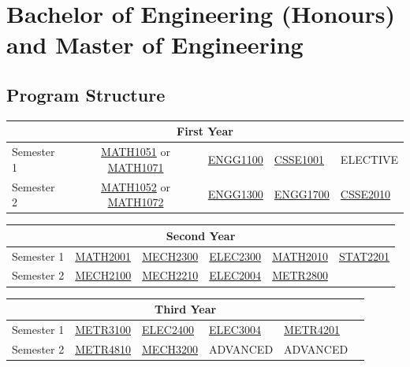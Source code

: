 \documentclass[a4paper,12pt]{report}
\begin{document}
\newpage

\section{Bachelor of Engineering (Honours) and Master of Engineering}
\subsection{Program Structure}
\renewcommand{\arraystretch}{1.5}
\begin{table}[H]
    \centering
    \begin{tabular}{| m{6em} | m{5em} m{5em} m{5em} m{5em} m{5em} |}
        \hline
        \multicolumn{6}{|c|}{\bfseries First Year} \\
        \hline
        Semester 1 & \multicolumn{2}{c}{\hyperlink{MATH1051}{MATH1051} or \hyperlink{MATH1071}{MATH1071}} & \hyperlink{ENGG1100}{ENGG1100} & \hyperlink{CSSE1001}{CSSE1001} & ELECTIVE \\
        Semester 2 & \multicolumn{2}{c}{\hyperlink{MATH1052}{MATH1052} or \hyperlink{MATH1072}{MATH1072}} & \hyperlink{ENGG1300}{ENGG1300} & \hyperlink{ENGG1700}{ENGG1700} & \hyperlink{CSSE2010}{CSSE2010} \\
        \hline
    \end{tabular}
\end{table}
\begin{table}[H]
    \centering
    \begin{tabular}{| m{6em} | m{5em} m{5em} m{5em} m{5em} m{5em} |}
        \hline
        \multicolumn{6}{|c|}{\bfseries Second Year} \\
        \hline
        Semester 1 & \hyperlink{MATH2001}{MATH2001} & \hyperlink{MECH2300}{MECH2300} & \hyperlink{ELEC2300}{ELEC2300} & \hyperlink{MATH2010}{MATH2010} & \hyperlink{STAT2201}{STAT2201} \\
        Semester 2 & \hyperlink{MECH2100}{MECH2100} & \hyperlink{MECH2210}{MECH2210} & \hyperlink{ELEC2004}{ELEC2004} & \hyperlink{METR2800}{METR2800} & \\
        \hline
    \end{tabular}
\end{table}
\begin{table}[H]
    \centering
    \begin{tabular}{| m{6em} | m{5em} m{5em} m{5em} m{5em} m{5em} |}
        \hline
        \multicolumn{6}{|c|}{\bfseries Third Year} \\
        \hline
        Semester 1 & \hyperlink{METR3100}{METR3100} & \hyperlink{ELEC2400}{ELEC2400} & \hyperlink{ELEC3004}{ELEC3004} & \hyperlink{METR4201}{METR4201} & \\
        Semester 2 & \hyperlink{METR4810}{METR4810} & \hyperlink{MECH3200}{MECH3200} & ADVANCED & ADVANCED & \\
        \hline
    \end{tabular}
\end{table}
\end{document}
